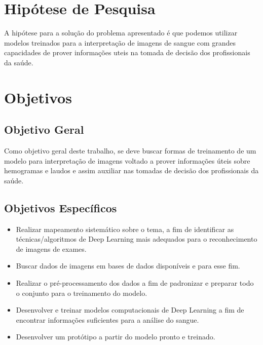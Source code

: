 \section{Hipótese de Pesquisa}
\label{sec:hipotese}
A hipótese para a solução do problema apresentado é que podemos utilizar modelos treinados para a interpretação de imagens de sangue com grandes capacidades de prover informações uteis na tomada de decisão dos profissionais da saúde.


\section{Objetivos}
\label{sec:objetivos}

\subsection{Objetivo Geral}
Como objetivo geral deste trabalho, se deve buscar formas de treinamento de um modelo para interpretação de imagens voltado a prover informações úteis sobre hemogramas e laudos e assim auxiliar nas tomadas de decisão dos profissionais da saúde.


\subsection{Objetivos Específicos}
\begin{itemize}
   \item Realizar mapeamento sistemático sobre o tema, a fim de identificar as técnicas/algoritmos de
Deep Learning mais adequados para o reconhecimento de imagens de exames.
   \item Buscar dados de imagens em bases de dados disponíveis e para esse fim.
   \item Realizar o pré-processamento dos dados a fim de padronizar e preparar todo o conjunto para o treinamento do modelo.
   \item Desenvolver e treinar modelos computacionais de Deep Learning a fim de encontrar informações suficientes para a análise do sangue.
   \item Desenvolver um protótipo a partir do modelo pronto e treinado.
\end{itemize}

